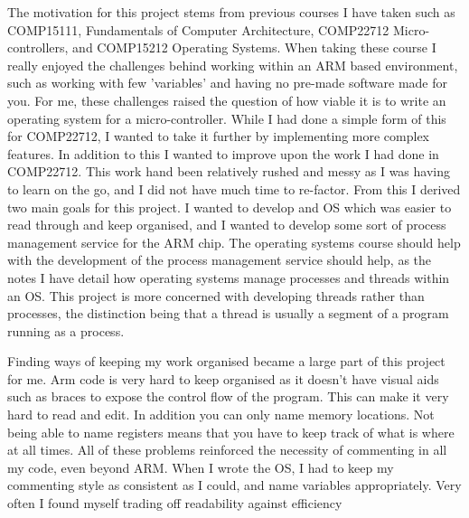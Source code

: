 \label{motivations}
The motivation for this project stems from previous courses I have taken such as COMP15111, Fundamentals of Computer Architecture, COMP22712 Micro-controllers, and COMP15212 Operating Systems. When taking these course I really enjoyed the challenges behind working within an ARM based environment, such as working with few 'variables' and having no pre-made software made for you. For me, these challenges raised the question of how viable it is to write an operating system for a micro-controller.
While I had done a simple form of this for COMP22712, I wanted to take it further by implementing more complex features. In addition to this I wanted to improve upon the work I had done in COMP22712. This work hand been relatively rushed and messy as I was having to learn on the go, and I did not have much time to re-factor. From this I derived two main goals for this project. I wanted to develop and OS which was easier to read through and keep organised, and I wanted to develop some sort of process management service for the ARM chip. The operating systems course should help with the development of the process management service should help, as the notes I have detail how operating systems manage processes and threads within an OS. This project is more concerned with developing threads rather than processes, the distinction being that a thread is usually a segment of a program running as a process. 

Finding ways of keeping my work organised became a large part of this project for me. Arm code is very hard to keep organised as it doesn't have visual aids such as braces to expose the control flow of the program. This can make it very hard to read and edit. In addition you can only name memory locations. Not being able to name registers means that you have to keep track of what is where at all times. All of these problems reinforced the necessity of commenting in all my code, even beyond ARM. When I wrote the OS, I had to keep my commenting style as consistent as I could, and name variables appropriately. Very often I found myself trading off readability against efficiency 